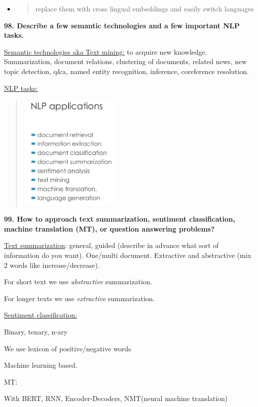 \begin{itemize}
\item
  \begin{quote}
  replace them with cross lingual embeddings and easily switch languages
  \end{quote}
\end{itemize}

\textbf{98. Describe a few semantic technologies and a few important NLP
tasks.}

\underline{Semantic technologies aka Text mining:} to acquire new
knowledge. Summarization, document relations, clustering of documents,
related news, new topic detection, q\&a, named entity recognition,
inference, coreference resolution.

\underline{NLP tasks:}

\begin{quote}
\includegraphics[width=1.93777in,height=2.20364in]{media/image29.png}
\end{quote}

\textbf{99. How to approach text summarization, sentiment
classification, machine translation (MT), or question answering
problems?}

\underline{Text summarization}: general, guided (describe in advance
what sort of information do you want). One/multi document. Extractive
and abstractive (mix 2 words like increase/decrease).

For short text we use \emph{abstractive} summarization.

For longer texts we use \emph{extractive} summarization.

\underline{Sentiment classification:}

Binary, tenary, n-ary

We use lexicon of positive/negative words

Machine learning based.

MT:

With BERT, RNN, Encoder-Decoders, NMT(neural machine translation)

